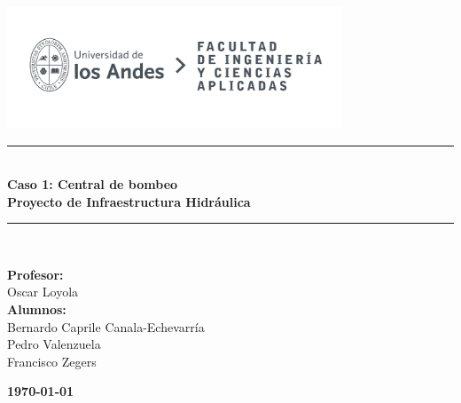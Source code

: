 \documentclass{article} %
\begin{document}
\begin{titlepage}%
\newcommand{\HRule}{\rule{\linewidth}{0.5mm}} 
\center 
\includegraphics[width=10cm]{LOGO_UNIVERSIDAD.jpg}\\ %
\vspace{3cm}
\HRule \\[0.4cm]
{ \huge \bfseries Caso 1: Central de bombeo}\\[0.4cm] %
{ \huge \bfseries Proyecto de Infraestructura Hidráulica}\\[0.4cm] %
\HRule \\[1.5cm]
 \vspace{5cm}
\begin{flushright}
    { \textbf{Profesor:}\\
    Oscar Loyola\\
    \vspace{0.2cm}
    \textbf{Alumnos:}\\
    Bernardo Caprile Canala-Echevarría\\
    Pedro Valenzuela\\
    Francisco Zegers
    \vspace{0.2cm}

}
\end{flushright}
\vspace{1cm}
{\large \textbf{\today}}\\[2cm] %
\end{titlepage}
\end{document}
